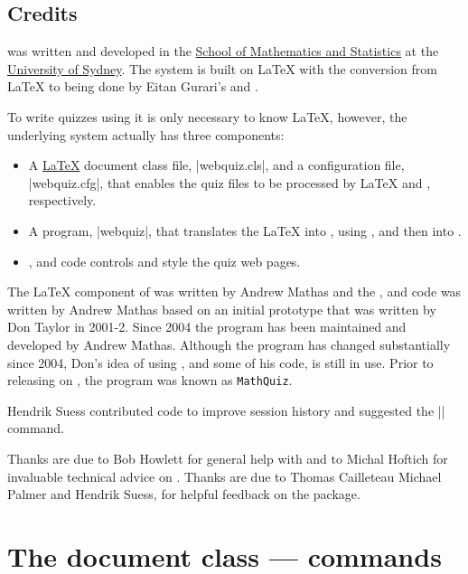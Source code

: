 \documentclass[svgnames]{article}
\newcommand\Ctan{\ctan[]{ctan}\xspace}
\begin{document}
  \subsection{Credits}
      \WebQuiz{} was written and developed in the
      \href{http://www.maths.usyd.edu.au/}{School of Mathematics and
      Statistics} at the \href{http://www.usyd.edu.au/}{University of
      Sydney}.  The system is built on \LaTeX{} with the conversion from
      \LaTeX{} to \HTML being done by Eitan Gurari's
      \TeXfht and .

      To write quizzes using \WebQuiz it is only necessary to know
      \LaTeX, however, the underlying \WebQuiz system actually has three
      components:
      \begin{itemize}
        \item A \href{https://www.latex-project.org/}{\LaTeX} document class
        file, \BashCode|webquiz.cls|, and a \TeXfht
        configuration file, \BashCode|webquiz.cfg|, that enables the
        quiz files to be processed by \LaTeX{} and \TeXfht, respectively.
        \item A \python program,
        \BashCode|webquiz|, that translates the
        \LaTeX{} into \XML, using \TeXfht, and then into \HTML.
        \item \CSS, \HTML and \Javascript code controls and style the
        quiz web pages.
      \end{itemize}

     The \LaTeX{} component of \WebQuiz{} was written by Andrew Mathas and
     the \python, \CSS and \Javascript code was written by Andrew Mathas
     based on an initial prototype that was written by Don Taylor in 2001-2.
     Since 2004 the program has been maintained and developed by Andrew
     Mathas. Although the program has changed substantially since 2004,
     Don's idea of using \TeXfht, and some of his code, is still
     in use. Prior to releasing \WebQuiz on \Ctan, the program was known
     as \texttt{MathQuiz}.

     Hendrik Suess contributed code to improve session history
     and suggested the \LatexCode|\qref| command.

     Thanks are due to Bob Howlett for general help with \CSS and to
     Michal Hoftich for invaluable technical advice on \TeXfht. Thanks
     are due to
        Thomas Cailleteau
        Michael Palmer and
        Hendrik Suess,
     for helpful feedback on the package.

   \section{The \WebQuiz document class ---  commands}
   \label{S:documentclass}
\end{document}
